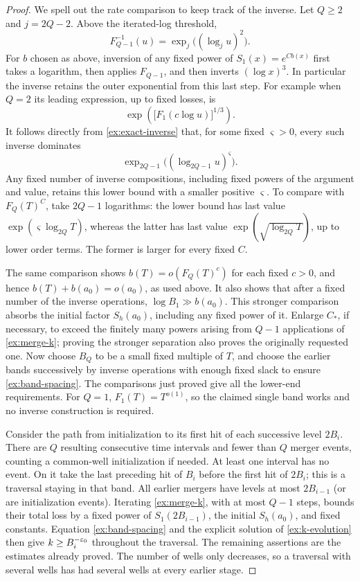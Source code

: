 \begin{proof}
We spell out the rate comparison to keep track of the inverse.
Let \(Q\ge2\) and \(j=2Q-2\). Above the iterated-log threshold,
\begin{equation}
 F_{Q-1}^{-1}(u)
   =\exp_j\bigl((\log_j u)^2\bigr).
 \label{ex:exact-inverse}
\end{equation}
For \(b\) chosen as above, inversion of any fixed power of
\(S_1(x)=e^{Cb(x)}\) first takes a logarithm, then applies
\(F_{Q-1}\), and then inverts \((\log x)^3\). In particular
the inverse retains the outer exponential from this last step.
For example when \(Q=2\) its leading expression, up to fixed
losses, is
\[
 \exp\!\left(\bigl[F_1(c\log u)\bigr]^{1/3}\right).
\]
It follows directly from \eqref{ex:exact-inverse} that, for some
fixed \(\varsigma>0\), every such inverse dominates
\[
 \exp_{2Q-1}\bigl((\log_{2Q-1}u)^{\varsigma}\bigr).
\]
Any fixed number of inverse compositions, including fixed powers
of the argument and value, retains this lower bound with a smaller
positive \(\varsigma\). To compare with \(F_Q(T)^C\), take
\(2Q-1\) logarithms: the lower bound has last value
\(\exp(\varsigma\log_{2Q}T)\), whereas the latter has last value
\(\exp(\sqrt{\log_{2Q}T})\), up to lower order terms.
The former is larger for every fixed \(C\).

The same comparison shows \(b(T)=o(F_Q(T)^c)\) for each fixed
\(c>0\), and hence \(b(T)+b(a_0)=o(a_0)\), as used above.
It also shows that after a fixed number of the inverse operations,
\(\log B_1\gg b(a_0)\). This stronger comparison absorbs the
initial factor \(S_h(a_0)\), including any fixed power of it.
Enlarge \(C_*\), if necessary, to exceed the finitely many powers
arising from \(Q-1\) applications of \eqref{ex:merge-k}; proving the
stronger separation also proves the originally requested one.
Now choose \(B_Q\) to be a small fixed multiple of \(T\), and
choose the earlier bands successively by inverse operations with
enough fixed slack to ensure \eqref{ex:band-spacing}.
The comparisons just proved give all the lower-end requirements.
For \(Q=1\), \(F_1(T)=T^{o(1)}\), so the claimed single band
works and no inverse construction is required.

Consider the path from initialization to its first hit of each
successive level \(2B_i\). There are \(Q\) resulting consecutive
time intervals and fewer than \(Q\) merger events, counting a
common-well initialization if needed. At least one interval has no
event. On it take the last preceding hit of \(B_i\) before the
first hit of \(2B_i\); this is a traversal staying in that band.
All earlier mergers have levels at most \(2B_{i-1}\) (or are
initialization events). Iterating \eqref{ex:merge-k}, with at most
\(Q-1\) steps, bounds their total loss by a fixed power of
\(S_1(2B_{i-1})\), the initial \(S_h(a_0)\), and fixed constants.
Equation \eqref{ex:band-spacing} and the explicit solution of
\eqref{ex:k-evolution} then give \(k\ge B_i^{-\varepsilon_0}\)
throughout the traversal. The remaining assertions are the estimates
already proved. The number of wells only decreases, so a traversal
with several wells has had several wells at every earlier stage.
\end{proof}
